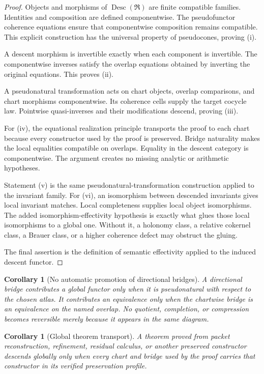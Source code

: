 \documentclass[11pt]{article}
\newtheorem{corollary}[theorem]{Corollary}
\theoremstyle{definition}
\theoremstyle{remark}
\DeclareMathOperator{\Desc}{Desc}
\begin{document}
\begin{proof}
Objects and morphisms of \(\Desc(\mathfrak R)\) are finite compatible families. Identities and composition are defined componentwise. The pseudofunctor coherence equations ensure that componentwise composition remains compatible. This explicit construction has the universal property of pseudocones, proving (i).

A descent morphism is invertible exactly when each component is invertible. The componentwise inverses satisfy the overlap equations obtained by inverting the original equations. This proves (ii).

A pseudonatural transformation acts on chart objects, overlap comparisons, and chart morphisms componentwise. Its coherence cells supply the target cocycle law. Pointwise quasi-inverses and their modifications descend, proving (iii).

For (iv), the equational realization principle transports the proof to each chart because every constructor used by the proof is preserved. Bridge naturality makes the local equalities compatible on overlaps. Equality in the descent category is componentwise. The argument creates no missing analytic or arithmetic hypotheses.

Statement (v) is the same pseudonatural-transformation construction applied to the invariant family. For (vi), an isomorphism between descended invariants gives local invariant matches. Local completeness supplies local object isomorphisms. The added isomorphism-effectivity hypothesis is exactly what glues those local isomorphisms to a global one. Without it, a holonomy class, a relative cokernel class, a Brauer class, or a higher coherence defect may obstruct the gluing.

The final assertion is the definition of semantic effectivity applied to the induced descent functor.
\end{proof}

\begin{corollary}[No automatic promotion of directional bridges]
A directional bridge contributes a global functor only when it is pseudonatural with respect to the chosen atlas. It contributes an equivalence only when the chartwise bridge is an equivalence on the named overlap. No quotient, completion, or compression becomes reversible merely because it appears in the same diagram.
\end{corollary}

\begin{corollary}[Global theorem transport]
A theorem proved from packet reconstruction, refinement, residual calculus, or another preserved constructor descends globally only when every chart and bridge used by the proof carries that constructor in its verified preservation profile.
\end{corollary}
\end{document}
